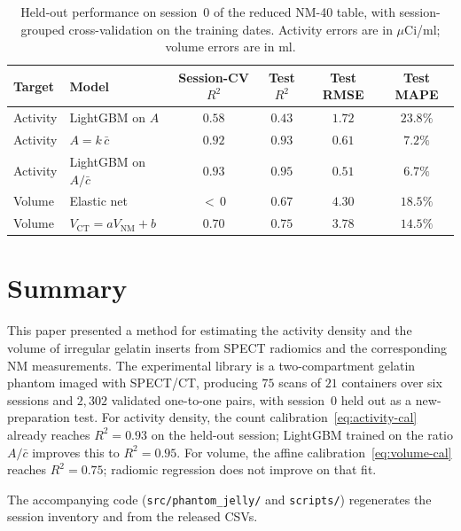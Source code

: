 \begin{table}[ht]
\centering
\caption{Held-out performance on session~$0$ of the reduced NM-40 table, with session-grouped cross-validation on the training dates.
Activity errors are in $\mu$Ci/ml; volume errors are in ml.}
\label{tab:ml}
\small
\begin{tabular}{llcccc}
\toprule
Target & Model & Session-CV $R^2$ & Test $R^2$ & Test RMSE & Test MAPE \\
\midrule
Activity & LightGBM on $A$ & $0.58$ & $0.43$ & $1.72$ & $23.8\%$ \\
Activity & $A = k\,\bar{c}$ & $0.92$ & $0.93$ & $0.61$ & $7.2\%$ \\
Activity & LightGBM on $A/\bar{c}$ & $0.93$ & $0.95$ & $0.51$ & $6.7\%$ \\
Volume & Elastic net & ${<}\,0$ & $0.67$ & $4.30$ & $18.5\%$ \\
Volume & $V_{\mathrm{CT}} = a V_{\mathrm{NM}}+b$ & $0.70$ & $0.75$ & $3.78$ & $14.5\%$ \\
\bottomrule
\end{tabular}
\end{table}

\FloatBarrier

\section{Summary}

This paper presented a method for estimating the activity density and the volume of irregular gelatin inserts from SPECT radiomics and the corresponding NM measurements.
The experimental library is a two-compartment gelatin phantom imaged with SPECT/CT, producing $75$ scans of $21$ containers over six sessions and $2{,}302$ validated one-to-one pairs, with session~$0$ held out as a new-preparation test.
For activity density, the count calibration~\eqref{eq:activity-cal} already reaches $R^2=0.93$ on the held-out session; LightGBM trained on the ratio $A/\bar{c}$ improves this to $R^2=0.95$.
For volume, the affine calibration~\eqref{eq:volume-cal} reaches $R^2=0.75$; radiomic regression does not improve on that fit.

The accompanying code (\texttt{src/phantom\_jelly/} and \texttt{scripts/}) regenerates the session inventory and  from the released CSVs.



